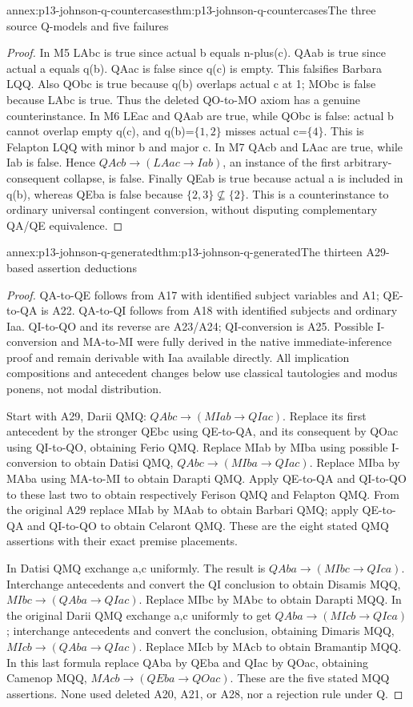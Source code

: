 \begin{annexitem}{annex:p13-johnson-q-countercases}{thm:p13-johnson-q-countercases}{The three source Q-models and five failures}
\begin{proof}
In M5 LAbc is true since actual b equals n-plus(c). QAab is true
since actual a equals q(b). QAac is false since q(c) is empty.
This falsifies Barbara LQQ. Also QObc is true because q(b) overlaps
actual c at 1; MObc is false because LAbc is true. Thus the deleted
QO-to-MO axiom has a genuine counterinstance.
In M6 LEac and QAab are true, while QObc is false: actual b cannot
overlap empty q(c), and q(b)=\(\{1,2\}\) misses actual c=\(\{4\}\).
This is Felapton LQQ with minor b and major c.
In M7 QAcb and LAac are true, while Iab is false. Hence
\(QAcb\to(LAac\to Iab)\), an instance of the first arbitrary-consequent
collapse, is false. Finally QEab is true because actual a is included
in q(b), whereas QEba is false because \(\{2,3\}\nsubseteq\{2\}\).
This is a counterinstance to ordinary universal contingent conversion,
without disputing complementary QA/QE equivalence.
\end{proof}
\end{annexitem}

\begin{annexitem}{annex:p13-johnson-q-generated}{thm:p13-johnson-q-generated}{The thirteen A29-based assertion deductions}
\begin{proof}
QA-to-QE follows from A17 with identified subject variables and A1;
QE-to-QA is A22. QA-to-QI follows from A18 with identified subjects
and ordinary Iaa. QI-to-QO and its reverse are A23/A24; QI-conversion
is A25. Possible I-conversion and MA-to-MI were fully derived in
the native immediate-inference proof and remain derivable with Iaa
available directly. All implication compositions and antecedent changes
below use classical tautologies and modus ponens, not modal distribution.

Start with A29, Darii QMQ:
\(QAbc\to(MIab\to QIac)\).
Replace its first antecedent by the stronger QEbc using QE-to-QA,
and its consequent by QOac using QI-to-QO, obtaining Ferio QMQ.
Replace MIab by MIba using possible I-conversion to obtain Datisi QMQ,
\(QAbc\to(MIba\to QIac)\).
Replace MIba by MAba using MA-to-MI to obtain Darapti QMQ.
Apply QE-to-QA and QI-to-QO to these last two to obtain respectively
Ferison QMQ and Felapton QMQ.
From the original A29 replace MIab by MAab to obtain Barbari QMQ;
apply QE-to-QA and QI-to-QO to obtain Celaront QMQ. These are
the eight stated QMQ assertions with their exact premise placements.

In Datisi QMQ exchange a,c uniformly. The result is
\(QAba\to(MIbc\to QIca)\). Interchange antecedents and convert
the QI conclusion to obtain Disamis MQQ,
\(MIbc\to(QAba\to QIac)\).
Replace MIbc by MAbc to obtain Darapti MQQ.
In the original Darii QMQ exchange a,c uniformly to get
\(QAba\to(MIcb\to QIca)\); interchange antecedents and convert
the conclusion, obtaining Dimaris MQQ,
\(MIcb\to(QAba\to QIac)\).
Replace MIcb by MAcb to obtain Bramantip MQQ.
In this last formula replace QAba by QEba and QIac by QOac,
obtaining Camenop MQQ, \(MAcb\to(QEba\to QOac)\).
These are the five stated MQQ assertions. None used deleted A20,
A21, or A28, nor a rejection rule under Q.
\end{proof}
\end{annexitem}
